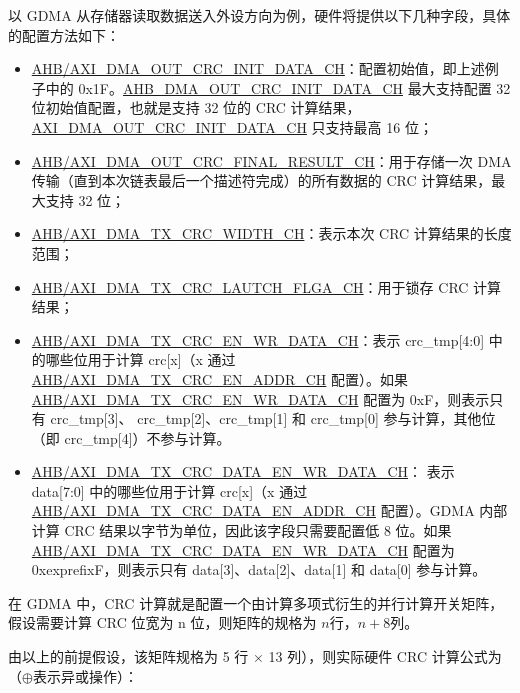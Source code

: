 \documentclass[main\_\_CN.tex]{subfiles}
\begin{document}
以 GDMA 从存储器读取数据送入外设方向为例，硬件将提供以下几种字段，具体的配置方法如下：
\begin{itemize}
\item \hyperref[fielddesc:AHBDMAOUTCRCINITDATACHN]{AHB/AXI\_DMA\_OUT\_CRC\_INIT\_DATA\_CH}：配置初始值，即上述例子中的 0x1F。\hyperref[fielddesc:AHBDMAOUTCRCINITDATACHN]{AHB\_DMA\_OUT\_CRC\_INIT\_DATA\_CH} 最大支持配置 32 位初始值配置，也就是支持 32 位的 CRC 计算结果，\hyperref[fielddesc:AXIDMAOUTCRCINITDATACHN]{AXI\_DMA\_OUT\_CRC\_INIT\_DATA\_CH} 只支持最高 16 位；
\item \hyperref[fielddesc:AHBDMAOUTCRCFINALRESULTCHN]{AHB/AXI\_DMA\_OUT\_CRC\_FINAL\_RESULT\_CH}：用于存储一次 DMA 传输（直到本次链表最后一个描述符完成）的所有数据的 CRC 计算结果，最大支持 32 位；
\item \hyperref[fielddesc:AHBDMATXCRCWIDTHCHN]{AHB/AXI\_DMA\_TX\_CRC\_WIDTH\_CH}：表示本次 CRC 计算结果的长度范围；
\item \hyperref[fielddesc:AHBDMATXCRCLAUTCHFLGACHN]{AHB/AXI\_DMA\_TX\_CRC\_LAUTCH\_FLGA\_CH}：用于锁存 CRC 计算结果；
\item \hyperref[fielddesc:AHBDMATXCRCENWRDATACHN]{AHB/AXI\_DMA\_TX\_CRC\_EN\_WR\_DATA\_CH}：表示 crc\_tmp[4:0] 中的哪些位用于计算 crc[x]（x 通过\hyperref[fielddesc:AHBDMATXCRCENADDRCHN]{AHB/AXI\_DMA\_TX\_CRC\_EN\_ADDR\_CH} 配置）。如果\hyperref[fielddesc:AHBDMATXCRCENWRDATACHN]{AHB/AXI\_DMA\_TX\_CRC\_EN\_WR\_DATA\_CH} 配置为 0xF，则表示只有 crc\_tmp[3]、 crc\_tmp[2]、crc\_tmp[1] 和 crc\_tmp[0] 参与计算，其他位（即 crc\_tmp[4]）不参与计算。
\item \hyperref[fielddesc:AHBDMATXCRCDATAENWRDATACHN]{AHB/AXI\_DMA\_TX\_CRC\_DATA\_EN\_WR\_DATA\_CH}： 表示 data[7:0] 中的哪些位用于计算 crc[x]（x 通过 \hyperref[fielddesc:AXIDMATXCRCDATAENADDRCHN]{AHB/AXI\_DMA\_TX\_CRC\_DATA\_EN\_ADDR\_CH} 配置）。GDMA 内部计算 CRC 结果以字节为单位，因此该字段只需要配置低 8 位。如果 \hyperref[fielddesc:AHBDMATXCRCDATAENWRDATACHN]{AHB/AXI\_DMA\_TX\_CRC\_DATA\_EN\_WR\_DATA\_CH} 配置为 0xexprefix{}F，则表示只有 data[3]、data[2]、data[1] 和 data[0] 参与计算。
\end{itemize}

在 GDMA 中，CRC 计算就是配置一个由计算多项式衍生的并行计算开关矩阵，假设需要计算 CRC 位宽为 n 位，则矩阵的规格为 $n$行，$n+8$列。

由以上的前提假设，该矩阵规格为 5 行 × 13 列），则实际硬件 CRC 计算公式为（\(\oplus\)表示异或操作）：
\end{document}
